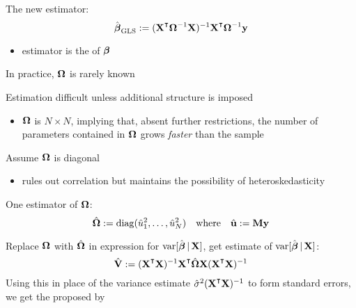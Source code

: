 \begin{frame}
    
    \vspace{2em}
    The new estimator:
    \begin{equation}
        \label{eq:glsest}
        \hboldbeta_{{\rm GLS}} 
        := (\boldX^\T \boldOmega^{-1} \boldX)^{-1} \boldX^\T \boldOmega^{-1} \boldy
    \end{equation}
    \begin{itemize}
    \item  estimator is the  of
    ${\boldsymbol \beta}$
    \end{itemize}
    
    \vspace{.7em}
    In practice, ${\boldsymbol \Omega}$ is rarely known
    
    Estimation difficult unless additional structure is imposed
    \begin{itemize}
        \item ${\boldsymbol \Omega}$ is $N \times N$, implying that, absent further
        restrictions, the number of parameters contained in ${\boldsymbol \Omega}$ grows 
        \emph{faster} than the sample
    \end{itemize}

\end{frame}

\begin{frame}

    \vspace{2em}
    Assume ${\boldsymbol \Omega}$ is diagonal
    \begin{itemize}
        \item rules out correlation but maintains the possibility of heteroskedasticity
    \end{itemize}
    
    One estimator of ${\boldsymbol \Omega}$:
    \begin{equation*}
        \hat {{\boldsymbol \Omega}} := \operatorname{diag}(\hat u^2_1, \ldots, \hat u^2_N)
        \quad \text{where} \quad
        \hat {\mathbf u} := \mathbf M {\mathbf y}
    \end{equation*}
    
    Replace ${\boldsymbol \Omega}$ with $\hat {{\boldsymbol \Omega}}$ in expression for
    $\operatorname{var} [\hat {\boldsymbol \beta} \, | \, \mathbf X]$, get estimate of $\operatorname{var} [\hat {\boldsymbol \beta} \, | \, \mathbf X]$:
    \begin{equation*}
        \label{eq:robse}
        \hat \boldV :=
        (\boldX^\T \boldX)^{-1} \boldX^\T \hat \boldOmega  \boldX
            (\boldX^\T \boldX)^{-1}
    \end{equation*}
    Using this in place of the variance estimate $\hat
    \sigma^2 (\boldX^\T \boldX)^{-1}$ to form standard errors, we get
    the  proposed by
    \cite{white1980heteroskedasticity}
    
\end{frame}

